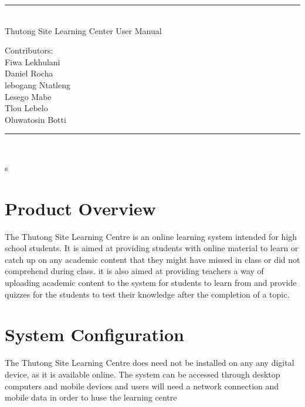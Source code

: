 \documentclass[12pt,a4paper]{article}
\begin{document}
	\begin{titlepage}
		\centering
		\vspace*{\fill}
		
		\vspace*{0.5cm}
		
		\huge\bfseries
		\rule{\textwidth}{1.6pt}\\[\baselineskip]
		Thutong Site Learning Center User Manual
		
		\vspace*{0.5cm}
		
		\large Contributors: \\[\baselineskip]
		
			{Fiwa Lekhulani\\Daniel Rocha\\lebogang Ntatleng\\Lesego Mabe\\Tlou Lebelo\\Oluwatosin Botti}
		
		\rule{\textwidth}{1.6pt}\\[\baselineskip]
		
		
		\vspace*{\fill}
	\end{titlepage}


	\date{\textbf{\today}}
	\pagebreak
	\tableofcontents
	\newpage

s

	\section{Product Overview}
		The Thutong Site Learning Centre is an online learning system intended for high school students. It is aimed at providing students with online material to learn or catch up on any academic content that they might have missed in class or did not comprehend during class. it is also aimed at providing teachers a way of uploading academic content to the system for students to learn from and provide quizzes for the students to test their knowledge after the completion of a topic. 
	
	\section{System Configuration}
		The Thutong Site Learning Centre does need not be installed on any any digital device, as it is available online. The system can be accessed through desktop computers and mobile devices and users will need a network connection and mobile data in order to huse the learning centre 
		
\end{document}
